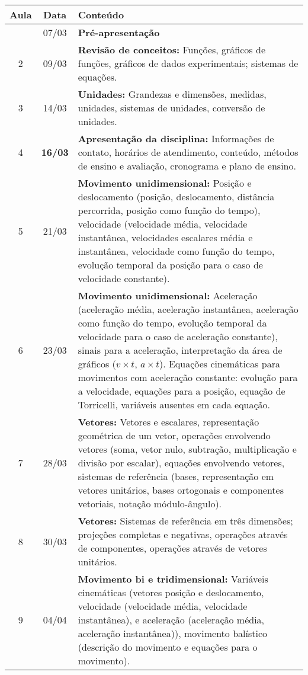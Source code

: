 \begin{center}
\begin{longtable}{ccp{70mm}}
\toprule
Aula & Data & Conteúdo \\
\midrule
\endhead
\bottomrule
\endfoot
1	 & 	07/03	 & 	\textbf{Pré-apresentação} \\
2	 & 	09/03	 & 	\textbf{Revisão de conceitos:} Funções, gráficos de funções, gráficos de dados experimentais; sistemas de equações. \\
3	 & 	14/03	 & 	\textbf{Unidades:} Grandezas e dimensões, medidas, unidades, sistemas de unidades, conversão de unidades. \\
4	 & 	\textbf{16/03}	 & 	\textbf{Apresentação da disciplina:} Informações de contato, horários de atendimento, conteúdo, métodos de ensino e avaliação, cronograma e plano de ensino.\\
5	 & 	21/03	 & 	\textbf{Movimento unidimensional:} Posição e deslocamento (posição, deslocamento, distância percorrida, posição como função do tempo), velocidade (velocidade média, velocidade instantânea, velocidades escalares média e instantânea, velocidade como função do tempo, evolução temporal da posição para o caso de velocidade constante).\\
6	 & 	23/03	 & 	\textbf{Movimento unidimensional:} Aceleração (aceleração média, aceleração instantânea, aceleração como função do tempo, evolução temporal da velocidade para o caso de aceleração constante), sinais para a aceleração, interpretação da área de gráficos ($v \times t$, $a \times  t$). Equações cinemáticas para movimentos com aceleração constante: evolução para a velocidade, equações para a posição, equação de Torricelli, variáveis ausentes em cada equação.\\
7	 & 	28/03	 & 	\textbf{Vetores:} Vetores e escalares, representação geométrica de um vetor, operações envolvendo vetores (soma, vetor nulo, subtração, multiplicação e divisão por escalar), equações envolvendo vetores, sistemas de referência (bases, representação em vetores unitários, bases ortogonais e componentes vetoriais, notação módulo-ângulo). \\
8	 & 	30/03	 & 	\textbf{Vetores:} Sistemas de referência em três dimensões; projeções completas e negativas, operações através de componentes, operações através de vetores unitários. \\
9	 & 	04/04	 & 	\textbf{Movimento bi e tridimensional:} Variáveis cinemáticas (vetores posição e deslocamento, velocidade (velocidade média, velocidade instantânea), e aceleração (aceleração média, aceleração instantânea)), movimento balístico (descrição do movimento e equações para o movimento). \\

\end{longtable}
\end{center}
